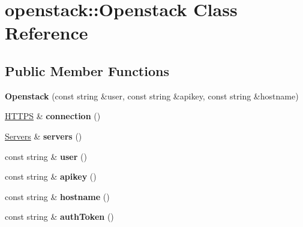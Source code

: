 \hypertarget{classopenstack_1_1Openstack}{
\section{openstack::Openstack Class Reference}
\label{classopenstack_1_1Openstack}
}
\subsection*{Public Member Functions}
\begin{DoxyCompactItemize}
\item 
\hypertarget{classopenstack_1_1Openstack_a69e20b0b47a39d45fdba732108ea3221}{
{\bfseries Openstack} (const string \&user, const string \&apikey, const string \&hostname)}
\label{classopenstack_1_1Openstack_a69e20b0b47a39d45fdba732108ea3221}

\item 
\hypertarget{classopenstack_1_1Openstack_a124e63d6510b068e5a88317f8b2b9179}{
\hyperlink{classopenstack_1_1HTTPS}{HTTPS} \& {\bfseries connection} ()}
\label{classopenstack_1_1Openstack_a124e63d6510b068e5a88317f8b2b9179}

\item 
\hypertarget{classopenstack_1_1Openstack_afbac316dd77c6c07e6d347749833db36}{
\hyperlink{classopenstack_1_1Servers}{Servers} \& {\bfseries servers} ()}
\label{classopenstack_1_1Openstack_afbac316dd77c6c07e6d347749833db36}

\item 
\hypertarget{classopenstack_1_1Openstack_a6f6c71afd392fb83d60b0f18a2c69fc8}{
const string \& {\bfseries user} ()}
\label{classopenstack_1_1Openstack_a6f6c71afd392fb83d60b0f18a2c69fc8}

\item 
\hypertarget{classopenstack_1_1Openstack_a4539573b6a9f11f506a10f24c85aa3f4}{
const string \& {\bfseries apikey} ()}
\label{classopenstack_1_1Openstack_a4539573b6a9f11f506a10f24c85aa3f4}

\item 
\hypertarget{classopenstack_1_1Openstack_a29a00b2b09f3c6bda10939c270b1822f}{
const string \& {\bfseries hostname} ()}
\label{classopenstack_1_1Openstack_a29a00b2b09f3c6bda10939c270b1822f}

\item 
\hypertarget{classopenstack_1_1Openstack_a21fd51d10fbdddb557a2f17fe0e1aafd}{
const string \& {\bfseries authToken} ()}
\label{classopenstack_1_1Openstack_a21fd51d10fbdddb557a2f17fe0e1aafd}


\end{DoxyCompactItemize}
